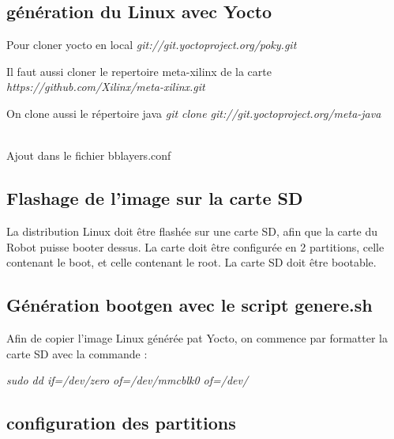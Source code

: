 \subsection{génération du Linux avec Yocto}
Pour cloner yocto en local
\textit{git://git.yoctoproject.org/poky.git}

Il faut aussi cloner le repertoire meta-xilinx de la carte 
\textit{https://github.com/Xilinx/meta-xilinx.git}

On clone aussi le répertoire java
\textit{git clone git://git.yoctoproject.org/meta-java}

\\

Ajout dans le fichier bblayers.conf
\\


\subsection{Flashage de l’image sur la carte SD}

La distribution Linux doit être flashée sur une carte SD, afin que la carte du Robot puisse booter dessus.
La carte doit être configurée en 2 partitions, celle contenant le boot, et celle contenant le root.
La carte SD doit être bootable.

\subsection{Génération bootgen avec le script genere.sh}
Afin de copier l'image Linux générée pat Yocto, on commence par formatter la carte SD avec la commande : 

\textit{sudo dd if=/dev/zero of=/dev/mmcblk0 of=/dev/
}
\subsection{configuration des partitions}

